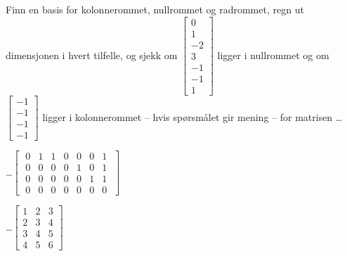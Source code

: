 

\begin{oppgave}
Finn en basis for kolonnerommet, nullrommet og radrommet, regn ut dimensjonen i hvert tilfelle, og sjekk om $\begin{bmatrix}
0\\
1\\
-2\\
3\\
-1\\
-1\\
1
\end{bmatrix}$ ligger i nullrommet og om $\begin{bmatrix}
-1\\
-1\\
-1\\
-1
\end{bmatrix}$ ligger i kolonnerommet -- hvis spørsmålet gir mening -- for matrisen \ldots

\begin{punkt}
\ldots$\begin{bmatrix}
\;0 & 1 & 1 & 0 & 0 & 0 & 1\;\\
\;0 & 0 & 0 & 0 & 1 & 0 & 1\;\\
\;0 & 0 & 0 & 0 & 0 & 1 & 1\;\\
\;0 & 0 & 0 & 0 & 0 & 0 & 0\;
\end{bmatrix}$ 
\end{punkt}

\begin{punkt}
\ldots$\begin{bmatrix}
	1 & 2 & 3\\
	2 & 3 & 4\\
	3 & 4 & 5\\
	4 & 5 & 6
	\end{bmatrix}$ 
\end{punkt}


\end{oppgave}

